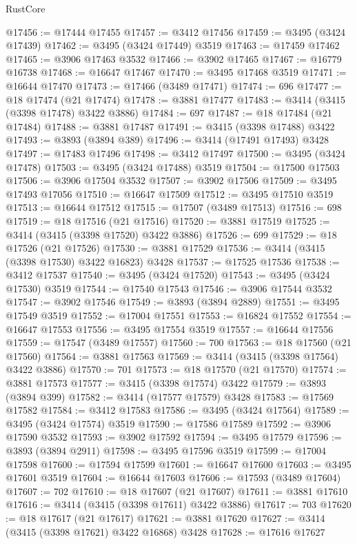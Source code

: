 \begin{lexlean}{RustCore}
\begin{coremodule}
@17456 := @17444 @17455
@17457 := @3412 @17456
@17459 := @3495 (@3424 @17439)
@17462 := @3495 (@3424 @17449) @3519
@17463 := @17459 @17462
@17465 := @3906 @17463 @3532
@17466 := @3902 @17465
@17467 := @16779 @16738
@17468 := @16647 @17467
@17470 := @3495 @17468 @3519
@17471 := @16644 @17470
@17473 := @17466 (@3489 @17471)
@17474 := 696
@17477 := @18 @17474 (@21 @17474)
@17478 := @3881 @17477
@17483 := @3414 (@3415 (@3398 @17478) @3422 @3886)
@17484 := 697
@17487 := @18 @17484 (@21 @17484)
@17488 := @3881 @17487
@17491 := @3415 (@3398 @17488) @3422
@17493 := @3893 (@3894 @389)
@17496 := @3414 (@17491 @17493) @3428
@17497 := @17483 @17496
@17498 := @3412 @17497
@17500 := @3495 (@3424 @17478)
@17503 := @3495 (@3424 @17488) @3519
@17504 := @17500 @17503
@17506 := @3906 @17504 @3532
@17507 := @3902 @17506
@17509 := @3495 @17493 @17056
@17510 := @16647 @17509
@17512 := @3495 @17510 @3519
@17513 := @16644 @17512
@17515 := @17507 (@3489 @17513)
@17516 := 698
@17519 := @18 @17516 (@21 @17516)
@17520 := @3881 @17519
@17525 := @3414 (@3415 (@3398 @17520) @3422 @3886)
@17526 := 699
@17529 := @18 @17526 (@21 @17526)
@17530 := @3881 @17529
@17536 := @3414 (@3415 (@3398 @17530) @3422 @16823) @3428
@17537 := @17525 @17536
@17538 := @3412 @17537
@17540 := @3495 (@3424 @17520)
@17543 := @3495 (@3424 @17530) @3519
@17544 := @17540 @17543
@17546 := @3906 @17544 @3532
@17547 := @3902 @17546
@17549 := @3893 (@3894 @2889)
@17551 := @3495 @17549 @3519
@17552 := @17004 @17551
@17553 := @16824 @17552
@17554 := @16647 @17553
@17556 := @3495 @17554 @3519
@17557 := @16644 @17556
@17559 := @17547 (@3489 @17557)
@17560 := 700
@17563 := @18 @17560 (@21 @17560)
@17564 := @3881 @17563
@17569 := @3414 (@3415 (@3398 @17564) @3422 @3886)
@17570 := 701
@17573 := @18 @17570 (@21 @17570)
@17574 := @3881 @17573
@17577 := @3415 (@3398 @17574) @3422
@17579 := @3893 (@3894 @399)
@17582 := @3414 (@17577 @17579) @3428
@17583 := @17569 @17582
@17584 := @3412 @17583
@17586 := @3495 (@3424 @17564)
@17589 := @3495 (@3424 @17574) @3519
@17590 := @17586 @17589
@17592 := @3906 @17590 @3532
@17593 := @3902 @17592
@17594 := @3495 @17579
@17596 := @3893 (@3894 @2911)
@17598 := @3495 @17596 @3519
@17599 := @17004 @17598
@17600 := @17594 @17599
@17601 := @16647 @17600
@17603 := @3495 @17601 @3519
@17604 := @16644 @17603
@17606 := @17593 (@3489 @17604)
@17607 := 702
@17610 := @18 @17607 (@21 @17607)
@17611 := @3881 @17610
@17616 := @3414 (@3415 (@3398 @17611) @3422 @3886)
@17617 := 703
@17620 := @18 @17617 (@21 @17617)
@17621 := @3881 @17620
@17627 := @3414 (@3415 (@3398 @17621) @3422 @16868) @3428
@17628 := @17616 @17627

\end{coremodule}
\end{lexlean}

